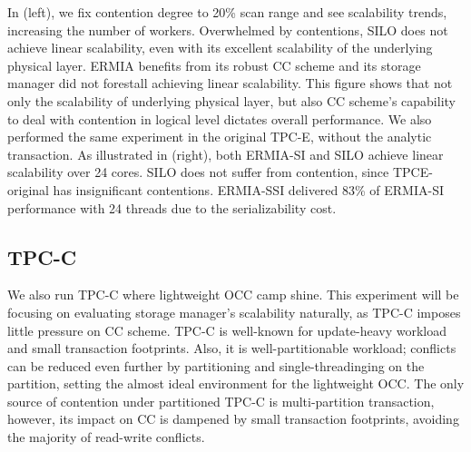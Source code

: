 In (left), we fix contention degree to 20\% scan range and see scalability trends, increasing the number of workers. Overwhelmed by contentions, SILO does not achieve linear scalability, even with its excellent scalability of the underlying physical layer. ERMIA benefits from its robust CC scheme and its storage manager did not forestall achieving linear scalability. This figure shows that not only the scalability of underlying physical layer, but also CC scheme's capability to deal with contention in logical level dictates overall performance. We also performed the same experiment in the original TPC-E, without the analytic transaction. As illustrated in (right), both ERMIA-SI and SILO achieve linear scalability over 24 cores. SILO does not suffer from contention, since TPCE-original has insignificant contentions. ERMIA-SSI delivered 83\% of ERMIA-SI performance with 24 threads due to the serializability cost.

\subsection{TPC-C} 
We also run TPC-C where lightweight OCC camp shine. This experiment will be focusing on evaluating storage manager's scalability naturally, as TPC-C imposes little pressure on CC scheme. TPC-C is well-known for update-heavy workload and small transaction footprints. Also, it is well-partitionable workload; conflicts can be reduced even further by partitioning and single-threadinging on the partition, setting the almost ideal environment for the lightweight OCC. The only source of contention under partitioned TPC-C is multi-partition transaction, however, its impact on CC is dampened by small transaction footprints, avoiding the majority of read-write conflicts. 

